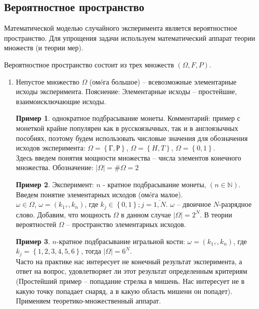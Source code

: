 \documentclass[a4paper, 12pt]{article}
\theoremstyle{definition}
\newtheorem{exmp}{Пример}[section]
\begin{document}
	\subsection{Вероятностное пространство}
	Математической моделью случайного эксперимента является вероятностное пространство. Для упрощения задачи используем математический аппарат теории множеств (и теории мер).\par
	Вероятностное пространство состоит из трех множеств $\left(\Omega, F, P\right)$.
	\begin{enumerate}
		\item Непустое множество $\Omega$ (омéга большое) – всевозможные элементарные исходы эксперимента. Пояснение: Элементарные исходы – простейшие, взаимоисключающие исходы.
		
		\begin{exmp}
		однократное подбрасывание монеты. Комментарий: пример с монеткой крайне популярен как в русскоязычных, так и в англоязычных пособиях, поэтому будем использовать числовые значения для обозначения исходов эксперимента: $\Omega=\left\{\text{Г},\text{Р}\right\}$, $\Omega=\left\{H,T\right\}$, $\Omega=\left\{0,1\right\}$.\\
		Здесь введем понятия мощности множества – числа элементов конечного множества. Обозначение: $\left|\Omega\right|=\#\Omega=2$
		\end{exmp}
		\begin{exmp}
		Эксперимент: $n$ - кратное подбрасывание монеты, $\left(n\in\mathbb {N}\right)$.
		Введем понятие элементарных исходов  (омéга малое).\\
		$\omega\in\Omega$, $\omega=\left(k_1,\dddot{},k_n\right)$, где $k_j\in\left\{0,1\right\};j=\overline{1,N}$. $\omega$ – двоичное $N$-разрядное слово.
		Добавим, что мощность $\Omega$ в данном случае $\left|\Omega\right|=2^N$. В теории вероятностей $\Omega$ – пространство элементарных исходов.
		\end{exmp}
		\begin{exmp}
			$n$-кратное подбрасывание игральной кости: $\omega=\left(k_1,\dddot{},k_n\right)$, где $k_j=\left\{1,2,3,4,5,6\right\}$, тогда $\left|\Omega\right|=6^N$.\\
			Часто на практике нас интересует не конечный результат эксперимента, а ответ на вопрос, удовлетворяет ли этот результат определенным критериям (Простейший пример – попадание стрелка в мишень. Нас интересует не в какую точку попадает снаряд, а в какую область мишени он попадет). Применяем теоретико-множественный аппарат.
		\end{exmp}

\end{enumerate}
\end{document}
